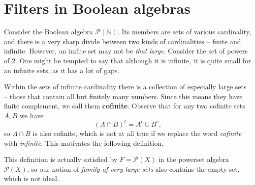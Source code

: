 \section{Filters in Boolean algebras}

Consider the Boolean algebra \( \mathcal{P}( \mathbb{N} ) \). Its members are sets of various cardinality, and there is a very sharp divide between two kinds of cardinalities -- finite and infinite. However, an inifite set may not be \emph{that large}. Consider the set of powers of \( 2 \). One might be tempted to say that although it is infinite, it is quite small for an infinite sets, as it has a lot of gaps.

Within the sets of infinite cardinality there is a collection of especially large sets -- those that contain all but finitely many numbers. Since this means they have finite complement, we call them \textbf{cofinite}. Observe that for any two cofinite sets \( A, B \) we have
\[ 
    (A \cap B)^c = A^c \cup B^c,
\]
so \( A \cap B \) is also cofinite, which is not at all true if we replace the word \emph{cofinite} with \emph{infinite}. This motivates the following definition.


This definition is actually satisfied by \( F = \mathcal{P}(X) \) in the powerset algebra \( \mathcal{P}(X) \), so our notion of \emph{family of very large sets} also contains the empty set, which is not ideal.



